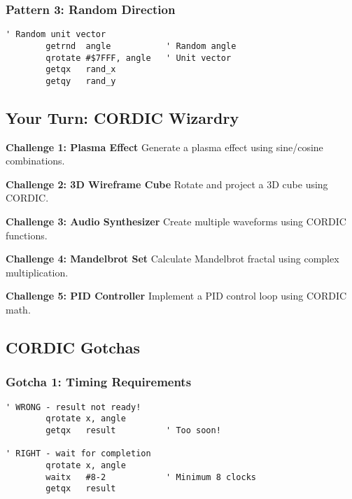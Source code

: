 \documentclass[11pt]{book}
\begin{document}
\hypertarget{pattern-3-random-direction}{%
\subsubsection{Pattern 3: Random
Direction}\label{pattern-3-random-direction}}

\begin{lstlisting}
' Random unit vector
        getrnd  angle           ' Random angle
        qrotate #$7FFF, angle   ' Unit vector
        getqx   rand_x
        getqy   rand_y
\end{lstlisting}

\hypertarget{your-turn-cordic-wizardry}{%
\subsection{Your Turn: CORDIC
Wizardry}\label{your-turn-cordic-wizardry}}

\begin{yourturn}
\textbf{Challenge 1: Plasma Effect}
Generate a plasma effect using sine/cosine combinations.

\textbf{Challenge 2: 3D Wireframe Cube}
Rotate and project a 3D cube using CORDIC.

\textbf{Challenge 3: Audio Synthesizer}
Create multiple waveforms using CORDIC functions.

\textbf{Challenge 4: Mandelbrot Set}
Calculate Mandelbrot fractal using complex multiplication.

\textbf{Challenge 5: PID Controller}
Implement a PID control loop using CORDIC math.
\end{yourturn}

\hypertarget{cordic-gotchas}{%
\subsection{CORDIC Gotchas}\label{cordic-gotchas}}

\hypertarget{gotcha-1-timing-requirements}{%
\subsubsection{Gotcha 1: Timing
Requirements}\label{gotcha-1-timing-requirements}}

\begin{lstlisting}
' WRONG - result not ready!
        qrotate x, angle
        getqx   result          ' Too soon!
        
' RIGHT - wait for completion
        qrotate x, angle
        waitx   #8-2            ' Minimum 8 clocks
        getqx   result
\end{lstlisting}
\end{document}
